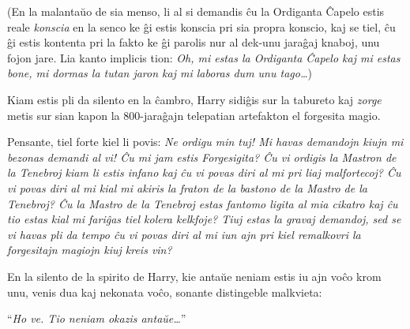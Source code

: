 (En la malantaŭo de sia menso, li al si demandis ĉu la Ordiganta
Ĉapelo estis reale \emph{konscia} en la senco ke ĝi estis konscia pri
sia propra konscio, kaj se tiel, ĉu ĝi estis kontenta pri la fakto ke
ĝi parolis nur al dek-unu jaraĝaj knaboj, unu fojon jare. Lia kanto
implicis tion: \emph{Oh, mi estas la Ordiganta Ĉapelo kaj mi estas
  bone, mi dormas la tutan jaron kaj mi laboras dum unu tago\ldots})

Kiam estis pli da silento en la ĉambro, Harry sidiĝis sur la tabureto
kaj \emph{zorge} metis sur sian kapon la 800-jaraĝajn telepatian
artefakton el forgesita magio.

Pensante, tiel forte kiel li povis: \emph{Ne ordigu min tuj! Mi havas
  demandojn kiujn mi bezonas demandi al vi! Ĉu mi jam estis
  Forgesigita?  Ĉu vi ordigis la Mastron de la Tenebroj kiam li estis
  infano kaj ĉu vi povas diri al mi pri liaj malfortecoj? Ĉu vi povas
  diri al mi kial mi akiris la fraton de la bastono de la Mastro de la
  Tenebroj?  Ĉu la Mastro de la Tenebroj estas fantomo ligita al mia
  cikatro kaj ĉu tio estas kial mi fariĝas tiel kolera kelkfoje? Tiuj
  estas la gravaj demandoj, sed se vi havas pli da tempo ĉu vi povas
  diri al mi iun ajn pri kiel remalkovri la forgesitajn magiojn kiuj
  kreis vin?}

En la silento de la spirito de Harry, kie antaŭe neniam estis iu ajn
voĉo krom unu, venis dua kaj nekonata voĉo, sonante distingeble
malkvieta:

``\emph{Ho ve. Tio neniam okazis antaŭe\ldots}''




